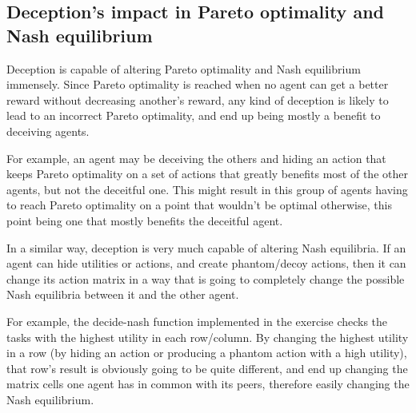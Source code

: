 \documentclass{aamas2017}
\begin{document}
    \subsection{Deception's impact in Pareto optimality and Nash equilibrium}
        \par
        Deception is capable of altering Pareto optimality and Nash equilibrium immensely. Since Pareto optimality is reached when no agent can get a better reward without decreasing another's reward, any kind of deception is likely to lead to an incorrect Pareto optimality, and end up being mostly a benefit to deceiving agents.
        \par
        For example, an agent may be deceiving the others and hiding an action that keeps Pareto optimality on a set of actions that greatly benefits most of the other agents, but not the deceitful one. This might result in this group of agents having to reach Pareto optimality on a point that wouldn't be optimal otherwise, this point being one that mostly benefits the deceitful agent.
        \par
        In a similar way, deception is very much capable of altering Nash equilibria. If an agent can hide utilities or actions, and create phantom/decoy actions, then it can change its action matrix in a way that is going to completely change the possible Nash equilibria between it and the other agent. 
        \par
        For example, the decide-nash function implemented in the exercise checks the tasks with the highest utility in each row/column. By changing the highest utility in a row (by hiding an action or producing a phantom action with a high utility), that row's result is obviously going to be quite different, and end up changing the matrix cells one agent has in common with its peers, therefore easily changing the Nash equilibrium.



\cite{woolridge:mas}
\cite{zlotkin:iidman}
\end{document}
